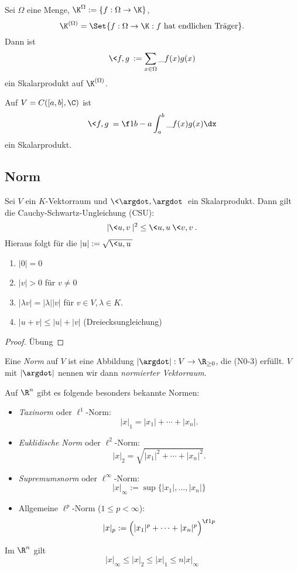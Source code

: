 \begin{ex}
	Sei $\Omega$ eine Menge, $\K^{\Omega} := \{f : \Omega \to \K\}$,
	\[
		\K^{(\Omega)} = \Set{ f: \Omega \to \K : f \text{ hat endlichen Träger} }.
	\]
	Dann ist
	\[
		\<f,g\> := \sum_{x\in \Omega} \_{f(x)}g(x)
	\]
	ein Skalarprodukt auf $\K^{(\Omega)}$.
\end{ex}

\begin{ex}
	Auf $V = C([a,b], \C)$ ist
	\[
		\<f,g\> = \f 1{b-a} \int_a^b \_{f(x)} g(x) \dx
	\]
	ein Skalarprodukt.
\end{ex}


\subsection{Norm}

\begin{st}
	Sei $V$ ein $K$-Vektorraum und $\<\argdot, \argdot\>$ ein Skalarprodukt.
	Dann gilt die Cauchy-Schwartz-Ungleichung (CSU):
	\[
		|\<u,v\>|^2 \le \<u,u\> \<v,v\>.
	\]
	Hieraus folgt für die  $|u| := \sqrt{\<u,u\>}$
	\begin{enumerate}[(N1),leftmargin=*,start=0]
		\item
			$|0| = 0$
		\item
			$|v| > 0$ für  $v\neq 0$
		\item
			$|\lambda v| = |\lambda| |v|$ für $v \in V, \lambda \in K$.
		\item
			$|u+v| \le |u| + |v|$ (Dreiecksungleichung)
	\end{enumerate}
	\begin{proof}
		Übung
	\end{proof}
\end{st}

\begin{df}
	Eine \emph{Norm} auf $V$ ist eine Abbildung $|\argdot| : V \to \R_{\ge 0}$, die (N0-3) erfüllt.
	$V$ mit $|\argdot|$ nennen wir dann \emph{normierter Vektorraum}.
\end{df}

\begin{ex}
	Auf $\R^n$ gibt es folgende besonders bekannte Normen:
	\begin{itemize}
		\item
			\emph{Taxinorm} oder $\ell^1$-Norm:
			\[
				|x|_1 = |x_1| + \dotsb + |x_n|.
			\]
		\item
			\emph{Euklidische Norm} oder $\ell^2$-Norm:
			\[
				|x|_2 = \sqrt{|x_1|^2 + \dotsb + |x_n|^2}.
			\]
		\item
			\emph{Supremumsnorm} oder $\ell^\infty$-Norm:
			\[
				|x|_\infty := \sup \{ |x_1|, \dotsc, |x_n| \}
			\]
		\item
			Allgemeine $\ell^p$-Norm ($1\le p < \infty$):
			\[
				|x|_p := \Big( |x_1|^p + \dotsb + |x_n|^p \Big)^{\f 1p}
			\]
	\end{itemize}
	\begin{note}
		Im $\R^n$ gilt
		\[
			|x|_\infty
			\le |x|_2
			\le |x|_1
			\le n |x|_\infty
		\]
	\end{note}
\end{ex}

